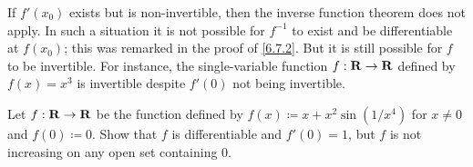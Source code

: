 \begin{note}
  If \(f'(x_0)\) exists but is non-invertible, then the inverse function theorem does not apply.
  In such a situation it is not possible for \(f^{-1}\) to exist and be differentiable at \(f(x_0)\);
  this was remarked in the proof of \cref{6.7.2}.
  But it is still possible for \(f\) to be invertible.
  For instance, the single-variable function \(f : \mathbf{R} \to \mathbf{R}\) defined by \(f(x) = x^3\) is invertible despite \(f'(0)\) not being invertible.
\end{note}

\exercisesection

\begin{exercise}\label{ex 6.7.1}
  Let \(f : \mathbf{R} \to \mathbf{R}\) be the function defined by \(f(x) \coloneqq x + x^2 \sin(1 / x^4)\) for \(x \neq 0\) and \(f(0) \coloneqq 0\).
  Show that \(f\) is differentiable and \(f'(0) = 1\), but \(f\) is not increasing on any open set containing \(0\).
\end{exercise}

